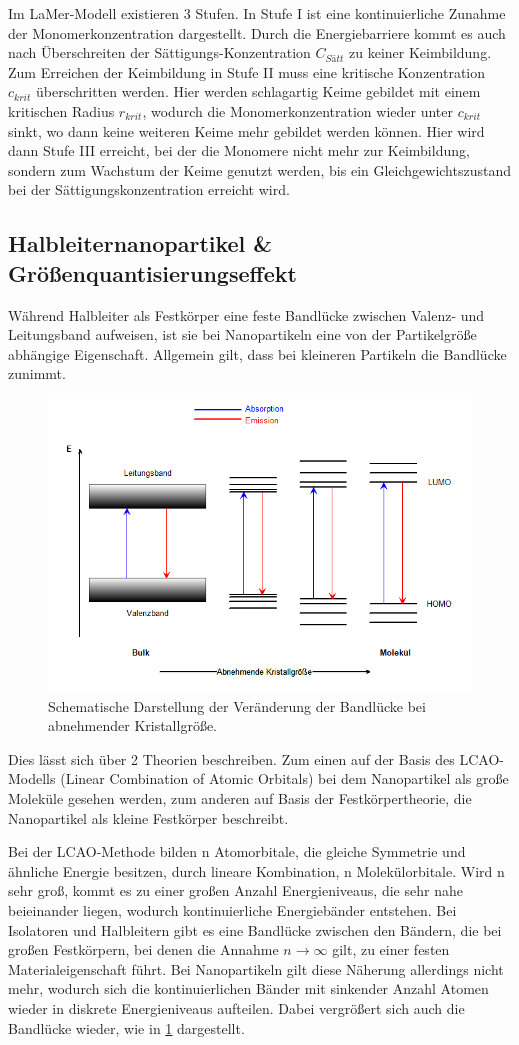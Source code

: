 	Im LaMer-Modell existieren 3 Stufen. 
	In Stufe I ist eine kontinuierliche Zunahme der Monomerkonzentration dargestellt.
	Durch die Energiebarriere kommt es auch nach Überschreiten der Sättigungs-Konzentration $C_{Sätt}$ zu keiner Keimbildung.
	Zum Erreichen der Keimbildung in Stufe II muss eine kritische Konzentration $c_{krit}$ überschritten werden.
	Hier werden schlagartig Keime gebildet mit einem kritischen Radius $r_{krit}$, wodurch die Monomerkonzentration wieder unter $c_{krit}$ sinkt, wo dann keine weiteren Keime mehr gebildet werden können.
	Hier wird dann Stufe III erreicht, bei der die Monomere nicht mehr zur Keimbildung, sondern zum Wachstum der Keime genutzt werden, bis ein Gleichgewichtszustand bei der Sättigungskonzentration erreicht wird.
	
	
	\subsection{Halbleiternanopartikel \& Größenquantisierungseffekt}
	Während Halbleiter als Festkörper eine feste Bandlücke zwischen Valenz- und Leitungsband aufweisen, ist sie bei Nanopartikeln eine von der Partikelgröße abhängige Eigenschaft.
	Allgemein gilt, dass bei kleineren Partikeln die Bandlücke zunimmt.
	\begin{figure}[h]
		\centering
		\includegraphics[width=0.6\linewidth]{Bilder/Quantumsizeeffect}
		\caption{Schematische Darstellung der Veränderung der Bandlücke bei abnehmender Kristallgröße.}
		\label{fig:LCAO}
	\end{figure}
	
    Dies lässt sich über 2 Theorien beschreiben. Zum einen auf der Basis des LCAO-Modells (Linear Combination of Atomic Orbitals) bei dem Nanopartikel als große Moleküle gesehen werden, zum anderen auf Basis der Festkörpertheorie, die Nanopartikel als kleine Festkörper beschreibt.
	
	Bei der LCAO-Methode bilden n Atomorbitale, die gleiche Symmetrie und ähnliche Energie besitzen, durch lineare Kombination, n Molekülorbitale. Wird n sehr groß, kommt es zu einer großen Anzahl Energieniveaus, die sehr nahe beieinander liegen, wodurch kontinuierliche Energiebänder entstehen. Bei Isolatoren und Halbleitern gibt es eine Bandlücke zwischen den Bändern, die bei großen Festkörpern, bei denen die Annahme $n \rightarrow \infty$  gilt, zu einer festen Materialeigenschaft führt. Bei Nanopartikeln gilt diese Näherung allerdings nicht mehr, wodurch sich die kontinuierlichen Bänder mit sinkender Anzahl Atomen wieder in diskrete Energieniveaus aufteilen. Dabei vergrößert sich auch die Bandlücke wieder, wie in \cref{fig:LCAO} dargestellt.
	
